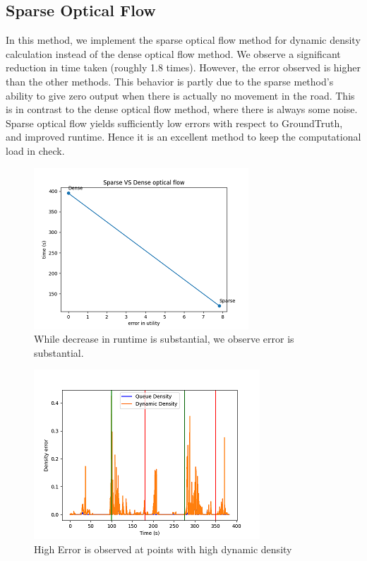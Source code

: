 \documentclass[conference]{IEEEtran}
\begin{document}
\subsection{Sparse Optical Flow}

In this method, we implement the sparse optical flow method for dynamic density calculation instead of the dense optical flow method.
We observe a significant reduction in time taken (roughly 1.8 times). However, the error observed is higher than the other methods.
This behavior is partly due to the sparse method's ability to give zero output when there is actually no movement in the road. This is in contrast to the dense optical flow method,
where there is always some noise. Sparse optical flow yields sufficiently low errors with respect to GroundTruth, and improved runtime. Hence it is an excellent method to keep the computational load in check.

\begin{figure}[htbp]
    \centerline{\includegraphics{plots/plot_sparse_optical.png}}
    \caption{While decrease in runtime is substantial, we observe error is substantial.}
    \label{sof_pvt}
\end{figure}

\begin{figure}[htbp]
    \centerline{\includegraphics{plots/plot_sparse_dense.png}}
    \caption{High Error is observed at points with high dynamic density}
    \label{sparse_frame_error}
\end{figure}
\end{document}
